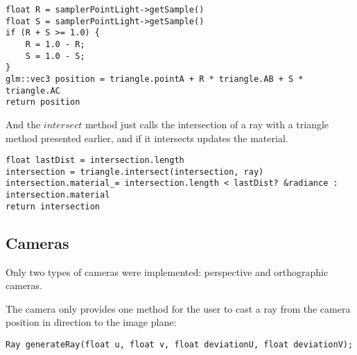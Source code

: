 \begin{lstlisting}[caption={Algorithm of getPosition in Area light}, captionpos=b, label=AreaLight]
float R = samplerPointLight->getSample()
float S = samplerPointLight->getSample()
if (R + S >= 1.0) {
	R = 1.0 - R;
	S = 1.0 - S;
}
glm::vec3 position = triangle.pointA + R * triangle.AB + S * triangle.AC
return position
\end{lstlisting}

\par
And the
$intersect$
method just calls the intersection of a ray with a triangle method presented earlier, and if it intersects updates the material.

\begin{lstlisting}[caption={Algorithm of intersect in Area light}, captionpos=b, label=AreaLight]
float lastDist = intersection.length
intersection = triangle.intersect(intersection, ray)
intersection.material_= intersection.length < lastDist? &radiance : intersection.material
return intersection
\end{lstlisting}

\subsection{Cameras}

\par
Only two types of cameras were implemented: perspective and orthographic cameras.

\par
The camera only provides one method for the user to cast a ray from the camera position in direction to the image plane:

\begin{lstlisting}[caption={Main methods in Camera}, captionpos=b, label=Camera]
Ray generateRay(float u, float v, float deviationU, float deviationV);
\end{lstlisting}

